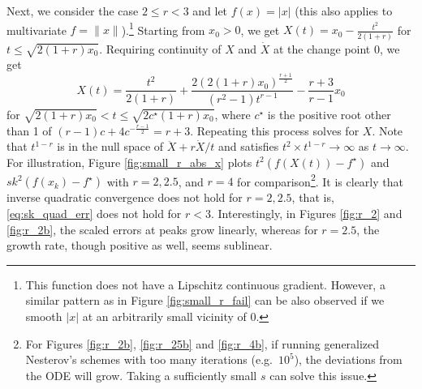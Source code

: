 \documentclass[twoside,11pt]{article}
\newcommand{\goto}{\rightarrow}
\begin{document}
Next, we consider the case $2 \le r < 3$ and let $f(x) = |x|$ (this
also applies to multivariate $f = \|x\|$).\footnote{This function does
  not have a Lipschitz continuous gradient. However, a similar pattern
  as in Figure \ref{fig:small_r_fail} can be also observed if we
  smooth $|x|$ at an arbitrarily small vicinity of 0.} Starting from
$x_0 > 0$, we get $X(t) = x_0 - \frac{t^2}{2(1+r)}$ for $t \le
\sqrt{2(1+r)x_0}$. Requiring continuity of $X$ and $\dot X$ at the
change point 0, we get
\[
X(t) = \frac{t^2}{2(1+r)} + \frac{2(2(1+r)x_0)^{\frac{r+1}{2}}}{(r^2-1)t^{r-1}} - \frac{r+3}{r-1}x_0
\]
for $\sqrt{2(1+r)x_0} < t \le \sqrt{2c^\star(1+r)x_0}$, where $c^\star$ is the positive root other than 1 of $(r-1)c + 4c^{-\frac{r-1}{2}} = r+3$. Repeating this process solves for $X$. Note that $t^{1-r}$ is in the null space of $\ddot X + r\dot X/t$ and satisfies $t^2 \times t^{1-r} \goto \infty$ as $t \goto \infty$. For illustration, Figure \ref{fig:small_r_abs_x} plots $t^2(f(X(t)) - f^\star)$ and $sk^2(f(x_k) - f^\star)$ with $r = 2, 2.5$, and $r = 4$ for comparison\footnote{For Figures \ref{fig:r_2b}, \ref{fig:r_25b} and \ref{fig:r_4b}, if running generalized Nesterov's schemes with too many iterations (e.g.~$10^5$), the deviations from the ODE will grow. Taking a sufficiently small $s$ can solve this issue.}. It is clearly that inverse quadratic convergence does not hold for $r = 2, 2.5$, that is, \eqref{eq:sk_quad_err} does not hold for $r < 3$. Interestingly, in Figures \ref{fig:r_2} and \ref{fig:r_2b}, the scaled errors at peaks grow linearly, whereas for $r = 2.5$, the growth rate, though positive as well, seems sublinear.
\end{document}
